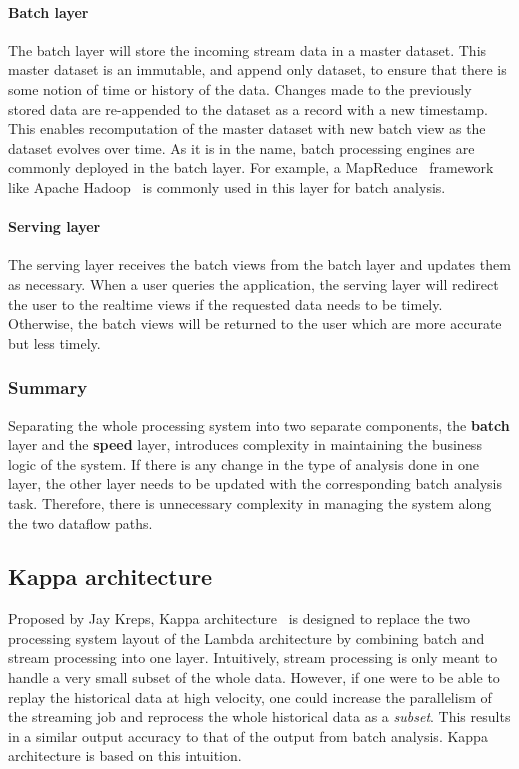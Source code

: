 \paragraph{Batch layer}%
\label{par:Batch layer}
The batch layer will store the incoming stream data in a master dataset. This master dataset is an immutable,
and append only dataset, to ensure that there is some notion of time or history of the data. Changes made to 
the previously stored data are re-appended to the dataset as a record with a new timestamp.  
This enables recomputation of the master dataset with new batch view as the dataset evolves over time. 
As it is in the name, batch processing engines are commonly deployed in the batch layer. For example, 
a MapReduce~\cite{mapreduce} framework like Apache Hadoop~\cite{hadoop} is commonly used in this 
layer for batch analysis. 


\paragraph{Serving layer}%
\label{par:Serving layer}

The serving layer receives the batch views from the batch layer and updates them as necessary. When a user 
queries the application, the serving layer will redirect the user to the realtime views if the 
requested data needs to be timely. Otherwise, the batch views will be returned to the user which are 
more accurate but less timely.  


\subsubsection{Summary}%
\label{ssub:Summary}

Separating the whole processing system into two separate components, the \textbf{batch} layer and 
the \textbf{speed} layer, introduces complexity in maintaining the business logic of the system. If 
there is any change in the type of analysis done in one layer, the other layer needs to be updated 
with the corresponding batch analysis task. Therefore, there is unnecessary complexity in managing 
the system along the two dataflow paths. 
    

\subsection{Kappa architecture}%
\label{sub:Kappa architecture}
Proposed by Jay Kreps, Kappa architecture~\cite{kappa_architecture} is designed to replace the 
two processing system layout of the Lambda architecture by combining batch and stream processing 
into one layer. Intuitively, stream processing is 
only meant to handle a very small subset of the whole data. However, if one were to be able 
to replay the historical data at high velocity, one could increase the parallelism of the streaming 
job and reprocess the whole historical data as a \emph{subset}. This results in a similar output accuracy
to that of the output from batch analysis. Kappa architecture is based on this intuition.   

